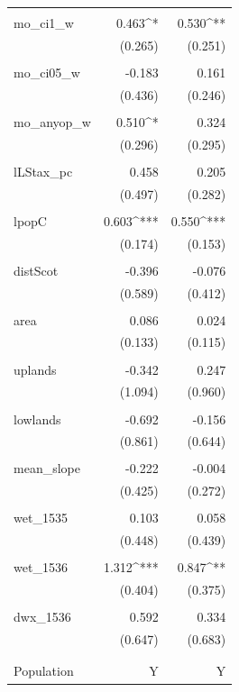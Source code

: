 \begin{table}[H]
\begin{tabular}{@{\extracolsep{.5pt}}lD{.}{.}{-3} D{.}{.}{-3} }
  & & \\ 
 mo\_ci1\_w & 0.463^{*} & 0.530^{**} \\ 
  & (0.265) & (0.251) \\ 
  & & \\ 
 mo\_ci05\_w & -0.183 & 0.161 \\ 
  & (0.436) & (0.246) \\ 
  & & \\ 
 mo\_anyop\_w & 0.510^{*} & 0.324 \\ 
  & (0.296) & (0.295) \\ 
  & & \\ 
 lLStax\_pc & 0.458 & 0.205 \\ 
  & (0.497) & (0.282) \\ 
  & & \\ 
 lpopC & 0.603^{***} & 0.550^{***} \\ 
  & (0.174) & (0.153) \\ 
  & & \\ 
 distScot & -0.396 & -0.076 \\ 
  & (0.589) & (0.412) \\ 
  & & \\ 
 area & 0.086 & 0.024 \\ 
  & (0.133) & (0.115) \\ 
  & & \\ 
 uplands & -0.342 & 0.247 \\ 
  & (1.094) & (0.960) \\ 
  & & \\ 
 lowlands & -0.692 & -0.156 \\ 
  & (0.861) & (0.644) \\ 
  & & \\ 
 mean\_slope & -0.222 & -0.004 \\ 
  & (0.425) & (0.272) \\ 
  & & \\ 
 wet\_1535 & 0.103 & 0.058 \\ 
  & (0.448) & (0.439) \\ 
  & & \\ 
 wet\_1536 & 1.312^{***} & 0.847^{**} \\ 
  & (0.404) & (0.375) \\ 
  & & \\ 
 dwx\_1536 & 0.592 & 0.334 \\ 
  & (0.647) & (0.683) \\ 
  & & \\ 
\hline \\[-1.8ex] 
Population & Y & Y \\ 

\end{tabular}
\end{table}
